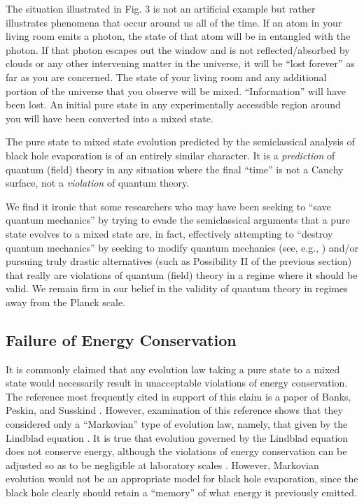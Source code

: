 \documentclass[12pt,nofootinbib,amsmath,amssymb,amsfonts,aps,prd,groupedaddress]{revtex4-1}
\begin{document}
The situation illustrated in Fig. 3 is not an artificial example but rather
illustrates phenomena that occur around us all of the time. If an atom in your
living room emits a photon, the state of that atom will be in entangled with the
photon. If that photon escapes out the window and is not reflected/absorbed by
clouds or any other intervening matter in the universe, it will be ``lost
forever'' as far as you are concerned. The state of your living room and any
additional portion of the universe that you observe will be mixed.
``Information'' will have been lost. An initial pure state in any experimentally accessible region
around you will have been converted into a mixed state.

The pure state to mixed state evolution predicted by the semiclassical analysis
of black hole evaporation is of an entirely similar character. It is a {\em
prediction} of quantum (field) theory in any situation where the final ``time''
is not a Cauchy surface, not a {\em violation} of quantum theory.

We find it ironic that some researchers who may have been seeking to ``save quantum
mechanics'' by trying to evade the semiclassical arguments that a pure state
evolves to a mixed state are, in fact, effectively attempting to ``destroy
quantum mechanics'' by seeking to modify quantum mechanics (see, e.g., \cite{lp}) 
and/or pursuing
truly drastic alternatives (such as Possibility II of the previous section) that
really are violations of quantum (field) theory in a regime where it should be
valid. We remain firm in our belief in the validity of quantum theory in regimes
away from the Planck scale.


\subsection{Failure of Energy Conservation} \label{en}

It is commonly claimed that any evolution law taking a pure state to a mixed
state would necessarily result in unacceptable violations of energy
conservation. The reference most frequently cited in support of this claim is a
paper of Banks, Peskin, and Susskind \cite{bps}. However, examination of this
reference shows that they considered only a ``Markovian'' type of evolution law,
namely, that given by the Lindblad equation \cite{lin}. It is true that evolution
governed by the Lindblad equation does not conserve energy, although the
violations of energy conservation can be adjusted so as to be negligible at
laboratory scales \cite{uw}. However, Markovian evolution would not be an
appropriate model for black hole evaporation, since the black hole clearly
should retain a ``memory'' of what energy it previously emitted. 
\end{document}
